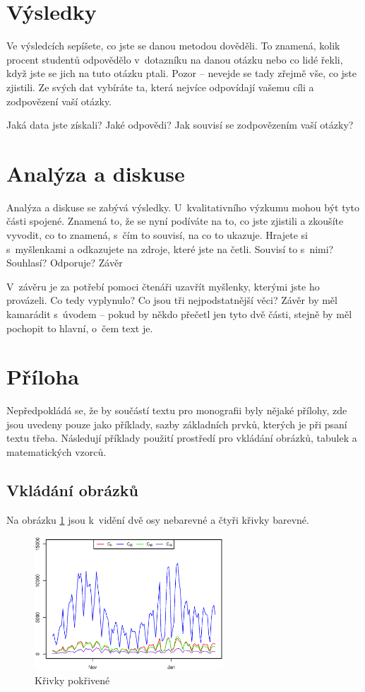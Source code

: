 \section*{Výsledky} 

Ve výsledcích sepíšete, co jste se danou metodou dověděli. To znamená, kolik procent studentů odpovědělo v~dotazníku na danou otázku nebo co lidé řekli, když jste se jich na tuto otázku ptali. Pozor – nevejde se tady zřejmě vše, co jste zjistili. Ze svých dat vybíráte ta, která nejvíce odpovídají vašemu cíli a zodpovězení vaší otázky. 

    Jaká data jste získali? Jaké odpovědi? 
    Jak souvisí se zodpovězením vaší otázky? 

\section*{Analýza a diskuse} 

Analýza a diskuse se zabývá výsledky. U~kvalitativního výzkumu mohou být tyto části spojené. Znamená to, že se nyní podíváte na to, co jste zjistili a zkoušíte vyvodit, co to znamená, s~čím to souvisí, na co to ukazuje. Hrajete si s~myšlenkami a odkazujete na zdroje, které jste na četli. Souvisí to s~nimi? Souhlasí? Odporuje?  
Závěr 

V~závěru je za potřebí pomoci čtenáři uzavřít myšlenky, kterými jste ho provázeli. Co tedy vyplynulo? Co jsou tři nejpodstatnější věci? Závěr by měl kamarádit s~úvodem – pokud by někdo přečetl jen tyto dvě části, stejně by měl pochopit to hlavní, o~čem text je. 

\section*{Příloha}
Nepředpokládá se, že by součástí textu pro monografii byly nějaké přílohy, zde jsou uvedeny pouze jako příklady, sazby základních prvků, kterých je při psaní textu třeba. Následují příklady použití prostředí pro vkládání obrázků, tabulek a matematických vzorců.

\subsection*{Vkládání obrázků}

Na obrázku \ref{fig:140-krivky_pokriv} jsou k~vidění dvě osy nebarevné a čtyři křivky barevné.

\begin{figure}[ht]
    \centering
    \includegraphics[width=200pt]{./pic/140-C0-80.eps}
    \caption{Křivky pokřivené}
    \label{fig:140-krivky_pokriv}
\end{figure}



